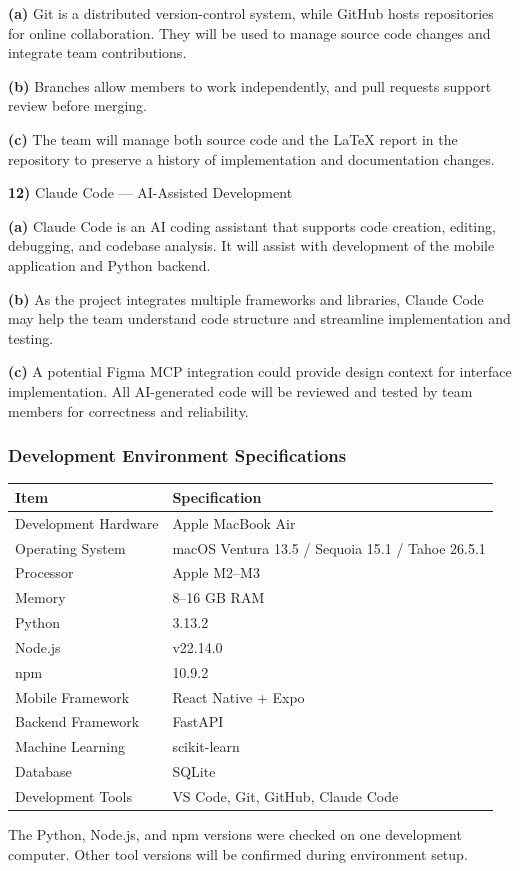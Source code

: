 \documentclass[conference]{IEEEtran}
\begin{document}
\par\noindent\textbf{(a)} Git is a distributed version-control system, while GitHub hosts repositories for online collaboration. They will be used to manage source code changes and integrate team contributions.
\par\noindent\textbf{(b)} Branches allow members to work independently, and pull requests support review before merging.
\par\noindent\textbf{(c)} The team will manage both source code and the LaTeX report in the repository to preserve a history of implementation and documentation changes.
\par\noindent\textbf{12)} Claude Code --- AI-Assisted Development
\par\noindent\textbf{(a)} Claude Code is an AI coding assistant that supports code creation, editing, debugging, and codebase analysis. It will assist with development of the mobile application and Python backend.
\par\noindent\textbf{(b)} As the project integrates multiple frameworks and libraries, Claude Code may help the team understand code structure and streamline implementation and testing.
\par\noindent\textbf{(c)} A potential Figma MCP integration could provide design context for interface implementation. All AI-generated code will be reviewed and tested by team members for correctness and reliability.
\subsubsection{Development Environment Specifications}
\begin{table}[htbp]\centering\footnotesize\begin{tabularx}{\columnwidth}{|p{}|X|}\hline
\textbf{Item} & \textbf{Specification} \\ \hline
Development Hardware & Apple MacBook Air \\ \hline
Operating System & macOS Ventura 13.5 / Sequoia 15.1 / Tahoe 26.5.1 \\ \hline
Processor & Apple M2--M3 \\ \hline
Memory & 8--16 GB RAM \\ \hline
Python & 3.13.2 \\ \hline
Node.js & v22.14.0 \\ \hline
npm & 10.9.2 \\ \hline
Mobile Framework & React Native + Expo \\ \hline
Backend Framework & FastAPI \\ \hline
Machine Learning & scikit-learn \\ \hline
Database & SQLite \\ \hline
Development Tools & VS Code, Git, GitHub, Claude Code \\ \hline
\end{tabularx}\end{table}
The Python, Node.js, and npm versions were checked on one development computer. Other tool versions will be confirmed during environment setup.
\end{document}
